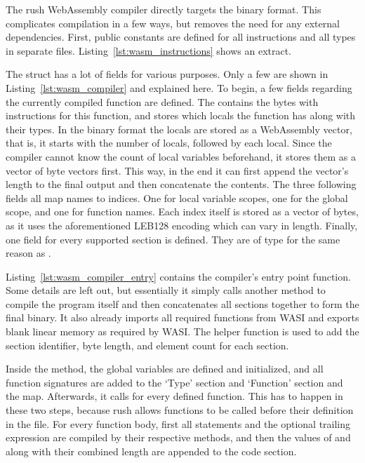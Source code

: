 The rush WebAssembly compiler directly targets the binary format.
This complicates compilation in a few ways, but removes the need for any external dependencies.
First, public constants are defined for all instructions and all types in separate files.
Listing~\ref{lst:wasm_instructions} shows an extract.

The  struct has a lot of fields for various purposes.
Only a few are shown in Listing~\ref{lst:wasm_compiler} and explained here.
To begin, a few fields regarding the currently compiled function are defined.
The  contains the bytes with instructions for this function, and  stores which locals the function has along with their types.
In the binary format the locals are stored as a WebAssembly vector, that is, it starts with the number of locals, followed by each local.
Since the compiler cannot know the count of local variables beforehand, it stores them as a vector of byte vectors first.
This way, in the end it can first append the vector's length to the final output and then concatenate the contents.
The three following fields all map names to indices.
One for local variable scopes, one for the global scope, and one for function names.
Each index itself is stored as a vector of bytes, as it uses the aforementioned LEB128 encoding which can vary in length.
Finally, one field for every supported section is defined.
They are of type  for the same reason as .


Listing~\ref{lst:wasm_compiler_entry} contains the compiler's entry point function.
Some details are left out, but essentially it simply calls another method to compile the program itself and then concatenates all sections together to form the final binary.
It also already imports all required functions from WASI and exports blank linear memory as required by WASI.
The  helper function is used to add the section identifier, byte length, and element count for each section.


Inside the  method, the global variables are defined and initialized, and all function signatures are added to the `Type' section and `Function' section and the  map.
Afterwards, it calls  for every defined function.
This has to happen in these two steps, because rush allows functions to be called before their definition in the file.
For every function body, first all statements and the optional trailing expression are compiled by their respective methods, and then the values of  and  along with their combined length are appended to the code section.

